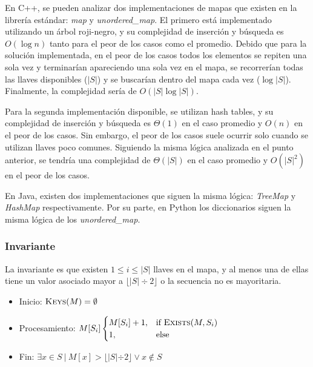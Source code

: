 \documentclass[letter]{article}
\begin{document}
En C++, se pueden analizar dos implementaciones de mapas que existen en la librería estándar: \textit{map} y \textit{unordered\_map}. El primero está implementado utilizando un árbol roji-negro, y su complejidad de inserción y búsqueda es $O(\log n)$ tanto para el peor de los casos como el promedio. Debido que para la solución implementada, en el peor de los casos todos los elementos se repiten una sola vez y terminarían apareciendo una sola vez en el mapa, se recorrerían todas las llaves disponibles ($|S|$) y se buscarían dentro del mapa cada vez ($\log |S|$). Finalmente, la complejidad sería de $O(|S| \log |S|)$. \par

Para la segunda implementación disponible, se utilizan hash tables, y su complejidad de inserción y búsqueda es $\Theta(1)$ en el caso promedio y $O(n)$ en el peor de los casos. Sin embargo, el peor de los casos suele ocurrir solo cuando se utilizan llaves poco comunes. Siguiendo la misma lógica analizada en el punto anterior, se tendría una complejidad de $\Theta(|S|)$ en el caso promedio y $O(|S|^2)$ en el peor de los casos. \par

En Java, existen dos implementaciones que siguen la misma lógica: \textit{TreeMap} y \textit{HashMap} respectivamente. Por su parte, en Python los diccionarios siguen la misma lógica de los \textit{unordered\_map}. \par

\subsubsection{Invariante} \label{algoritmos:iterativo:invariante}

La invariante es que existen $1 \leq i \leq |S|$ llaves en el mapa, y al menos una de ellas tiene un valor asociado mayor a $\lfloor |S| \div 2 \rfloor$ o la secuencia no es mayoritaria.

\begin{itemize}
    \item Inicio: $\Call{Keys}{M} = \emptyset$
    \item Procesamiento: $M[S_i] 
        \begin{cases}
            M[S_i] + 1, & \text{if } \Call{Exists}{M,S_i} \\
            1, & \text{else }
        \end{cases}$
    \item Fin: $\exists x \in S ~|~ M[x]> \lfloor |S| \div 2 \rfloor \lor x \notin S$
\end{itemize}
\end{document}
